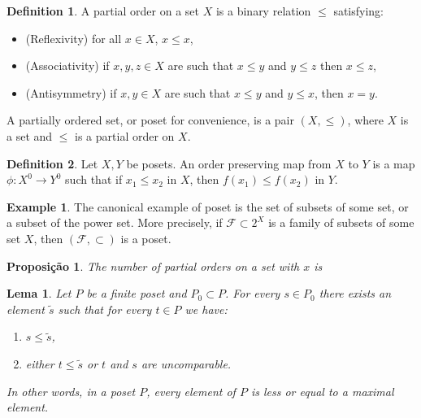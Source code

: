\documentclass[]{article}
\newtheorem{proposition}{Proposição}[section]
\newtheorem{lemma}{Lema}[section]
\theoremstyle{definition}
\newtheorem{definition}{Definition}[section]
\theoremstyle{definition}
\newtheorem{exmp}{Example}[section]
\newcommand{\raw}{\rightarrow}
\begin{document}
\begin{definition}
	A partial order on a set $X$ is a binary relation $\leq$ satisfying:
	
	\begin{itemize}
		\item (Reflexivity) for all $x \in X$, $x \leq x$,

		\item (Associativity) if $x, y, z \in X$ are such that $x \leq y$ and $y \leq z$ then $x \leq z$,

		\item (Antisymmetry) if $x, y \in X$ are such that $x\leq y$ and $y\leq x$, then $x=y$.
	\end{itemize}

	A partially ordered set, or poset for convenience, is a pair $(X, \leq)$, where $X$ is a set and $\leq$ is a partial order on $X$.
\end{definition}

\begin{definition}
	Let $X, Y$ be posets. An order preserving map from $X$ to $Y$ is a map $\phi:X^0 \raw Y^0$ such that if $x_1 \leq x_2$ in $X$, then $f(x_1) \leq f(x_2)$ in $Y$.
\end{definition}

\begin{exmp}
	The canonical example of poset is the set of subsets of some set, or a subset of the power set. More precisely, if $\mathcal{F} \subset 2^X$ is a family of subsets of some set $X$, then $(\mathcal{F}, \subset)$ is a poset.
	
\end{exmp}


\begin{proposition}
	The number of partial orders on a set with $x$ is
\end{proposition}

\begin{lemma}
	Let $P$ be a finite poset and $P_0 \subset P$. For every $s \in P_0$ there exists an element $\tilde{s}$ such that for every $t \in P$ we have:
	
	\begin{enumerate}
		\item $s \leq \tilde{s}$,
		
		\item either $t \leq \tilde{s}$ or $t$ and $s$ are uncomparable.
	\end{enumerate}
	 
	In other words, in a poset $P$, every element of $P$ is less or equal to a maximal element.
\end{lemma}
\end{document}
